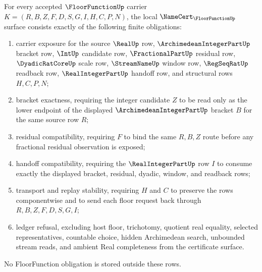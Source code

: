 \begin{theorem}
\label{thm:floor-function-namecert-obligations}
For every accepted $\FloorFunctionUp$ carrier $K=(R,B,Z,F,D,S,G,I,H,C,P,N)$, the local $\NameCert_{\FloorFunctionUp}$ surface consists exactly of the following finite obligations:
\begin{enumerate}
\item carrier exposure for the source $\RealUp$ row, $\ArchimedeanIntegerPartUp$ bracket row, $\IntUp$ candidate row, $\FractionalPartUp$ residual row, $\DyadicRatCoreUp$ scale row, $\StreamNameUp$ window row, $\RegSeqRatUp$ readback row, $\RealIntegerPartUp$ handoff row, and structural rows $H,C,P,N$;
\item bracket exactness, requiring the integer candidate $Z$ to be read only as the lower endpoint of the displayed $\ArchimedeanIntegerPartUp$ bracket $B$ for the same source row $R$;
\item residual compatibility, requiring $F$ to bind the same $R,B,Z$ route before any fractional residual observation is exposed;
\item handoff compatibility, requiring the $\RealIntegerPartUp$ row $I$ to consume exactly the displayed bracket, residual, dyadic, window, and readback rows;
\item transport and replay stability, requiring $H$ and $C$ to preserve the rows componentwise and to send each floor request back through $R,B,Z,F,D,S,G,I$;
\item ledger refusal, excluding host floor, trichotomy, quotient real equality, selected representatives, countable choice, hidden Archimedean search, unbounded stream reads, and ambient Real completeness from the certificate surface.
\end{enumerate}
No FloorFunction obligation is stored outside these rows.
\end{theorem}
